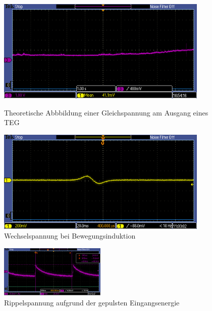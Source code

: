 \begin{figure}[ht]
 \begin{minipage}{0.5\textwidth}
 \includegraphics[width=0.9\textwidth]{2TheoretischeGrundlagen/imag/Solarstrom.PNG}
    \caption{Theoretische Abbbildung einer Gleichspannung am Ausgang eines TEG}
    \label{dc} 
 \end{minipage}
 \begin{minipage}{0.5\textwidth}
     \includegraphics[width=0.9\textwidth]{2TheoretischeGrundlagen/imag/acPremospule.PNG}
    \caption{Wechselspannung bei Bewegungsinduktion}
    \label{ac} 
 \end{minipage}
\end{figure}

\begin{figure}[ht]
     \includegraphics[width=0.45\textwidth]{2TheoretischeGrundlagen/imag/Rippel.PNG}
    \caption{Rippelspannung aufgrund der gepulsten Eingangsenergie}
    \label{rippel} 
\end{figure}



